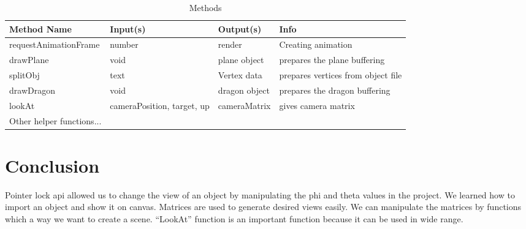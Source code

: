 \documentclass{article}
\begin{document}
\begin{table}[!ht]
  \caption{Methods}
  \label{methods}
  \centering
  \begin{tabular}{llll}
    \toprule
    \cmidrule(r){1-4}
    Method Name & Input(s) & Output(s) & Info\\
    \midrule
    requestAnimationFrame    & number   & render      & Creating animation\\
    drawPlane & void & plane object & prepares the plane buffering \\
    splitObj & text & Vertex data & prepares vertices from object file \\
    drawDragon & void & dragon object & prepares the dragon buffering \\
    lookAt  & cameraPosition, target, up & cameraMatrix & gives camera matrix\\
    Other helper functions...\\
    \bottomrule
  \end{tabular}
\end{table}

\section{Conclusion}
Pointer lock api allowed us to change the view of an object by manipulating the phi and theta values in the project. We learned how to import an object and show it on canvas. Matrices are used to generate desired views easily. We can manipulate the matrices by functions which a way we want to create a scene. “LookAt” function is an important function because it can be used in wide range.


\end{document}
